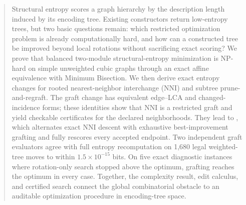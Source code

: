 \begin{abstract}
Structural entropy scores a graph hierarchy by the description length induced
by its encoding tree. Existing constructors return low-entropy trees, but two
basic questions remain: which restricted optimization problem is already
computationally hard, and how can a constructed tree be improved beyond local
rotations without sacrificing exact scoring? We prove that balanced
two-module structural-entropy minimization is NP-hard on simple unweighted
cubic graphs through an exact affine equivalence with Minimum Bisection. We
then derive exact entropy changes for rooted nearest-neighbor interchange
(NNI) and subtree prune-and-regraft. The graft change has equivalent edge--LCA
and changed-incidence forms; these identities show that NNI is a restricted
graft and yield checkable certificates for the declared neighborhoods. They
lead to \GNEST, which alternates exact NNI descent with exhaustive
best-improvement grafting and fully rescores every accepted endpoint. Two
independent graft evaluators agree with full entropy recomputation on 1,680
legal weighted-tree moves to within $1.5\times10^{-15}$ bits. On five exact
diagnostic instances where rotation-only search stopped above the optimum,
grafting reaches the optimum in every case. Together, the complexity result,
edit calculus, and certified search connect the global combinatorial obstacle
to an auditable optimization procedure in encoding-tree space.
\end{abstract}
